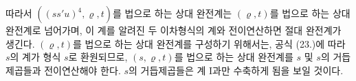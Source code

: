 
따라서 $((ss'u)^4,\varrho,t)$를 법으로 하는 상대 완전계는 $(\varrho,t)$를 법으로 하는 상대 완전계로 넘어가며, 이 계를 알려진 두 이차형식의 계와 전이연산하면 절대 완전계가 생긴다. $(\varrho,t)$를 법으로 하는 상대 완전계를 구성하기 위해서는, 공식 (23.)에 따라 $s$의 계가 형식 $s$로 환원되므로, $(s,\varrho,t)$를 법으로 하는 상대 완전계를 $s$ 및 $s$의 거듭제곱들과 전이연산해야 한다. $s$의 거듭제곱들은 계 I과만 수축하게 됨을 보일 것이다.

